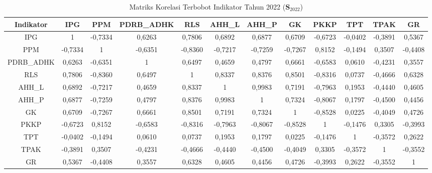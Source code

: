 \begin{table}[H]
\centering
\caption{Matriks Korelasi Terbobot Indikator Tahun 2022 ($\mathbf{S}_{2022}$)} \label{tab:app2matriks_intra_loading_2022}
\begin{adjustbox}{max width=\textwidth, max height=0.85\textheight}
\begin{tabular}{|c|c|c|c|c|c|c|c|c|c|c|c|}
\hline
\textbf{Indikator} & \textbf{IPG} & \textbf{PPM} & \textbf{PDRB\_ADHK} & \textbf{RLS} & \textbf{AHH\_L} & \textbf{AHH\_P} & \textbf{GK} & \textbf{PKKP} & \textbf{TPT} & \textbf{TPAK} & \textbf{GR} \\
\hline
IPG & 1 & -0,7334 & 0,6263 & 0,7806 & 0,6892 & 0,6877 & 0,6709 & -0,6723 & -0,0402 & -0,3891 & 0,5367 \\
PPM & -0,7334 & 1 & -0,6351 & -0,8360 & -0,7217 & -0,7259 & -0,7267 & 0,8152 & -0,1494 & 0,3507 & -0,4408 \\
PDRB\_ADHK & 0,6263 & -0,6351 & 1 & 0,6497 & 0,4659 & 0,4797 & 0,6661 & -0,6583 & 0,0610 & -0,4231 & 0,3557 \\
RLS & 0,7806 & -0,8360 & 0,6497 & 1 & 0,8337 & 0,8376 & 0,8501 & -0,8316 & 0,0737 & -0,4666 & 0,6328 \\
AHH\_L & 0,6892 & -0,7217 & 0,4659 & 0,8337 & 1 & 0,9983 & 0,7191 & -0,7963 & 0,1953 & -0,4440 & 0,4605 \\
AHH\_P & 0,6877 & -0,7259 & 0,4797 & 0,8376 & 0,9983 & 1 & 0,7324 & -0,8067 & 0,1797 & -0,4500 & 0,4456 \\
GK & 0,6709 & -0,7267 & 0,6661 & 0,8501 & 0,7191 & 0,7324 & 1 & -0,8528 & 0,0225 & -0,4049 & 0,4726 \\
PKKP & -0,6723 & 0,8152 & -0,6583 & -0,8316 & -0,7963 & -0,8067 & -0,8528 & 1 & -0,1476 & 0,3305 & -0,3993 \\
TPT & -0,0402 & -0,1494 & 0,0610 & 0,0737 & 0,1953 & 0,1797 & 0,0225 & -0,1476 & 1 & -0,3572 & 0,2622 \\
TPAK & -0,3891 & 0,3507 & -0,4231 & -0,4666 & -0,4440 & -0,4500 & -0,4049 & 0,3305 & -0,3572 & 1 & -0,3552 \\
GR & 0,5367 & -0,4408 & 0,3557 & 0,6328 & 0,4605 & 0,4456 & 0,4726 & -0,3993 & 0,2622 & -0,3552 & 1 \\
\hline
\end{tabular}
\end{adjustbox}
\end{table}